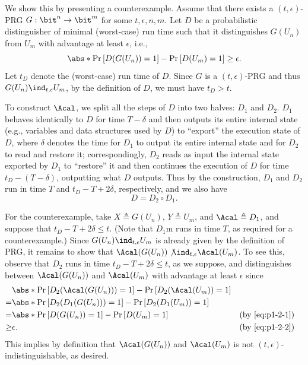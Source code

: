 \begin{answer}[b]
    We show this by presenting a counterexample.
    Assume that there exists a $(t,\epsilon)$-PRG $G:\bit^n\to \bit^m$ for some $t,\epsilon,n,m$. Let $D$ be a probabilistic distinguisher of minimal (worst-case) run time such that it distinguishes $G(U_n)$ from $U_m$ with advantage at least $\epsilon$, i.e.,
    \begin{equation}\label{eq:p1-2-2}
        \abs*{\Pr\left[D(G(U_n))=1\right]-\Pr\left[D(U_m)=1\right]} \ge \epsilon.
    \end{equation}
    Let $t_D$ denote the (worst-case) run time of $D$. Since $G$ is a $(t,\epsilon)$-PRG and thus $G(U_n)\ind_{t, \epsilon} U_m$, by the definition of $D$, we must have $t_D\gt t$. 

    To construct $\Acal$, we split all the steps of $D$ into two halves: $D_1$ and $D_2$. $D_1$ behaves identically to $D$ for time $T-\delta$ and then outputs its entire internal state (e.g., variables and data structures used by $D$)  to ``export'' the execution state of $D$, where $\delta$ denotes the time for $D_1$ to output its entire internal state and for $D_2$ to read and restore it; correspondingly, $D_2$ reads as input the internal state exported by $D_1$ to ``restore'' it and then continues the execution of $D$ for time $t_D-(T-\delta)$, outputting what $D$ outputs. Thus by the construction, $D_1$ and $D_2$ run in time $T$ and $t_D-T+2\delta$, respectively, and we also have
    \begin{equation}\label{eq:p1-2-1}
        D = D_2 \circ D_1.
    \end{equation}

    For the counterexample, take $X\triangleq G(U_n)$, $Y\triangleq U_m$, and $\Acal\triangleq D_1$, and suppose that $t_D-T+2\delta\le t$. (Note that $D_1$m runs in time $T$, as required for a counterexample.) Since $G(U_n)\ind_{t, \epsilon} U_m$ is already given by the definition of PRG, it remains to show that $\Acal(G(U_n))\not\ind_{t, \epsilon} \Acal(U_m)$. To see this, observe that $D_2$ runs in time $t_D-T+2\delta\le t$, as we suppose, and distinguishes between $\Acal(G(U_n))$ and $\Acal(U_m)$ with advantage at least $\epsilon$ since
    \begin{align*}
        &\abs*{\Pr\left[D_2(\Acal(G(U_n)))=1\right]-\Pr\left[D_2(\Acal(U_m))=1\right]}\\
        =& \abs*{\Pr\left[D_2(D_1(G(U_n)))=1\right]-\Pr\left[D_2(D_1(U_m))=1\right]}\\
        =& \abs*{\Pr\left[D(G(U_n))=1\right]-\Pr\left[D(U_m)=1\right]} &&(\textrm{by \eqref{eq:p1-2-1}})\\
        \ge& \epsilon. &&(\textrm{by \eqref{eq:p1-2-2}})
    \end{align*}
    This implies by definition that  $\Acal(G(U_n))$ and $\Acal(U_m)$ is not $(t,\epsilon)$-indistinguishable, as desired.
\end{answer}




